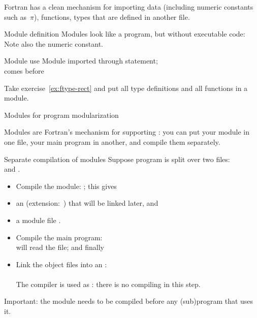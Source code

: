 
Fortran has a clean mechanism for importing data (including numeric
constants such as~$\pi$), functions, types
that are defined in another file.

\begin{block}{Module definition}
  \label{sl:fmod-def}
  Modules look like a program, but without executable code:
  Note also the numeric constant.
\end{block}

\begin{block}{Module use}
  \label{sl:fmod-use}
  Module imported through  statement;\\
  comes before 
\end{block}

\begin{exercise}
  \label{ex:fmod-rect}
  Take exercise~\ref{ex:ftype-rect} and put all type definitions and
  all functions in a module.
\end{exercise}

 {Modules for program modularization}

Modules are Fortran's mechanism for supporting
: you can put your module in one
file, your main program in another, and compile them separately.

\begin{block}{Separate compilation of modules}
  \label{sl:fcompile-mods}
  Suppose program is split over two files:\\
   and .
  \begin{itemize}
  \item Compile the module: ; this gives
  \item an  (extension:~)
    that will be linked later, and
  \item a module file .
  \item Compile the main program:\\
     will read the  file; and finally
  \item Link the object files into an :\\
    \\
    The compiler is used as : there is no compiling
    in this step.
  \end{itemize}
  Important: the module needs to be compiled before any (sub)program
  that uses it.
\end{block}

